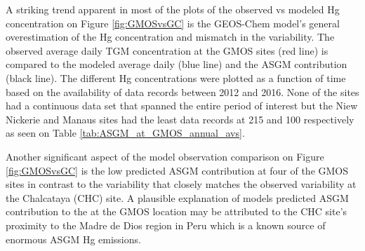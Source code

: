\begin{flushleft}
A striking trend apparent in most of the plots of the observed vs modeled Hg concentration on Figure \ref{fig:GMOSvsGC} is the GEOS-Chem model's general overestimation of the Hg concentration and mismatch in the variability. The observed average daily TGM concentration at the GMOS sites (red line) is compared to the modeled \on average daily \hg (blue line) and the ASGM contribution (black line). The different Hg concentrations were plotted as a function of time based on the availability of data records between 2012 and 2016. None of the sites had a continuous data set that spanned the entire period of interest but the Niew Nickerie and Manaus sites had the least data records at 215 and 100 respectively as seen on Table \ref{tab:ASGM_at_GMOS_annual_avs}.   
\end{flushleft}
\begin{table}[H]
\label{tab:ASGM_at_GMOS_annual_avs}

\centering
{}

\end{table}



\begin{flushleft}
Another significant aspect of the model observation comparison on Figure \ref{fig:GMOSvsGC} is the low predicted ASGM contribution at  four of the GMOS sites in contrast to the variability that closely matches the observed variability at the Chalcataya (CHC) site. A plausible explanation of models predicted ASGM contribution to the \hg at the GMOS location may be attributed to the CHC site's proximity to the Madre de Dios region in Peru which is a known source of enormous ASGM Hg emissions. 
\end{flushleft}

